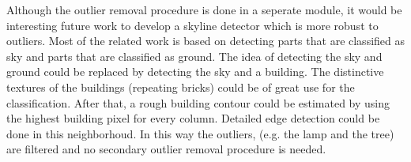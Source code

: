 Although the outlier removal procedure is done in a seperate module, it would be
interesting future work to develop a skyline detector which is more robust to outliers.
Most of the related work is based on detecting parts that are
classified as sky and parts that are classified as ground. The
idea of detecting the sky and ground could be replaced by detecting the sky and a building. The distinctive
textures of the buildings (repeating bricks) could be of great use for the
classification.  After that, a rough building contour could be estimated by using the highest building pixel for every column. Detailed edge detection could be
done in this neighborhoud. In this way the outliers, (e.g. the lamp and the
tree) are filtered and no secondary outlier removal procedure is needed.


